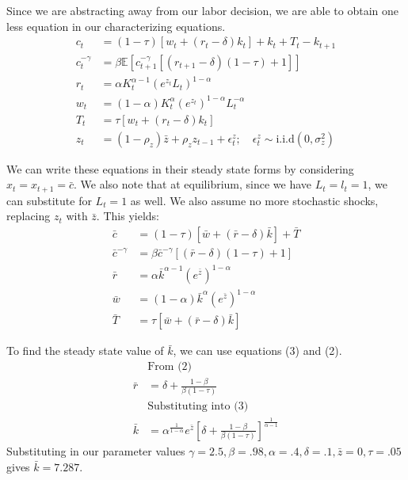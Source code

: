 \documentclass{article}
\begin{document}
	Since we are abstracting away from our labor decision, we are able to obtain one less equation in our characterizing equations. 
	\begin{align*}
	c_t &= (1 -\tau)[w_t + (r_t - \delta)k_t] + k_t + T_t - k_{t+1} \\
	c_t^{-\gamma} &= \beta \mathbb{E}\left[c_{t+1}^{-\gamma}[(r_{t+1} - \delta)(1 -\tau) + 1] \right] \\
	r_t &= \alpha K_t^{\alpha -1} (e^{z_t}L_t)^{1-\alpha}\\
	w_t &= (1-\alpha) K_t^{\alpha} (e^{z_t})^{1-\alpha} L_t^{-\alpha}  \\
	T_t &= \tau[w_t + (r_t - \delta) k_t] \\
	z_t &= (1 - \rho_z)\bar{z} + \rho_z z_{t-1} + \epsilon^z_t; \quad \epsilon_t^z \sim \text{i.i.d}(0, \sigma_z^2)
	\end{align*}
	
	We can write these equations in their steady state forms by considering $x_t = x_{t+1} = \bar{c}$. We also note that at equilibrium, since we have $L_t = l_t = 1$, we can substitute for $L_t = 1$ as well. We also assume no more stochastic shocks, replacing $z_t$ with $\bar{z}$. This yields:
	\begin{align}
	\bar{c} &= (1 -\tau)[\bar{w} + (\bar{r} - \delta)\bar{k}] + \bar{T} \\
	\bar{c}^{-\gamma} &= \beta \bar{c}^{-\gamma}[(\bar{r} - \delta)(1 -\tau) + 1]  \\
	\bar{r} &= \alpha \bar{k}^{\alpha -1} (e^{\bar{z}})^{1-\alpha}\\
	\bar{w} &= (1-\alpha) \bar{k}^{\alpha} (e^{\bar{z}})^{1-\alpha}  \\
	\bar{T} &= \tau[\bar{w} + (\bar{r} - \delta) \bar{k}] 
	\end{align}
	
	To find the steady state value of $\bar{k}$, we can use equations (3) and (2).
	\begin{align*}
	&\text{From (2)}\\ 
	\bar{r} &= \delta + \frac{1-\beta}{\beta(1-\tau)} \\
	&\text{Substituting into (3)} \\
	\bar{k} &= \alpha^{\frac{1}{1-\alpha}} e^{\bar{z}} [\delta + \frac{1-\beta}{\beta(1-\tau)} ]^{\frac{1}{\alpha -1}}	
	\end{align*}
	Substituting in our parameter values $\gamma = 2.5, \beta = .98, \alpha =.4, \delta = .1, \bar{z} = 0, \tau = .05$ gives $\bar{k} =7.287$.
	
\end{document}
